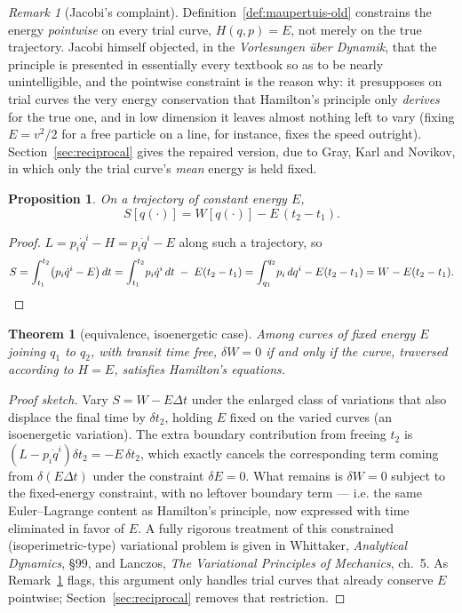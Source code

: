 \documentclass[11pt]{book}
\theoremstyle{definition}
\theoremstyle{plain}
\newtheorem{proposition}[definition]{Proposition}
\newtheorem{theorem}[definition]{Theorem}
\theoremstyle{remark}
\newtheorem{remark}[definition]{Remark}
\begin{document}
\begin{remark}[Jacobi's complaint]
\label{rem:jacobi-complaint}
Definition~\ref{def:maupertuis-old} constrains the energy \emph{pointwise} on every trial curve, $H(q,p)=E$, not merely on the true trajectory. Jacobi himself objected, in the \emph{Vorlesungen über Dynamik}, that the principle is presented in essentially every textbook so as to be nearly unintelligible, and the pointwise constraint is the reason why: it presupposes on trial curves the very energy conservation that Hamilton's principle only \emph{derives} for the true one, and in low dimension it leaves almost nothing left to vary (fixing $E=v^2/2$ for a free particle on a line, for instance, fixes the speed outright). Section~\ref{sec:reciprocal} gives the repaired version, due to Gray, Karl and Novikov, in which only the trial curve's \emph{mean} energy is held fixed.
\end{remark}

\begin{proposition}
\label{prop:S-W}
On a trajectory of constant energy $E$,
\[
S[q(\cdot)] = W[q(\cdot)] - E\,(t_2-t_1).
\]
\end{proposition}
\begin{proof}
$L = p_i\dot q^i - H = p_i\dot q^i - E$ along such a trajectory, so
\[
S=\int_{t_1}^{t_2}\!\big(p_i\dot q^i-E\big)\,dt=\int_{t_1}^{t_2}\! p_i\dot q^i\,dt \;-\;E(t_2-t_1)=\int_{q_1}^{q_2}\! p_i\,dq^i-E(t_2-t_1)=W-E(t_2-t_1). \qedhere
\]
\end{proof}

\begin{theorem}[equivalence, isoenergetic case]
Among curves of fixed energy $E$ joining $q_1$ to $q_2$, with transit time free, $\delta W=0$ if and only if the curve, traversed according to $H=E$, satisfies Hamilton's equations.
\end{theorem}
\begin{proof}[Proof sketch]
Vary $S=W-E\Delta t$ under the enlarged class of variations that also displace the final time by $\delta t_2$, holding $E$ fixed on the varied curves (an isoenergetic variation). The extra boundary contribution from freeing $t_2$ is $\left(L - p_i\dot q^i\right)\delta t_2=-E\,\delta t_2$, which exactly cancels the corresponding term coming from $\delta(E\Delta t)$ under the constraint $\delta E=0$. What remains is $\delta W=0$ subject to the fixed-energy constraint, with no leftover boundary term --- i.e. the same Euler--Lagrange content as Hamilton's principle, now expressed with time eliminated in favor of $E$. A fully rigorous treatment of this constrained (isoperimetric-type) variational problem is given in Whittaker, \emph{Analytical Dynamics}, \S99, and Lanczos, \emph{The Variational Principles of Mechanics}, ch.~5. As Remark~\ref{rem:jacobi-complaint} flags, this argument only handles trial curves that already conserve $E$ pointwise; Section~\ref{sec:reciprocal} removes that restriction.
\end{proof}
\end{document}
